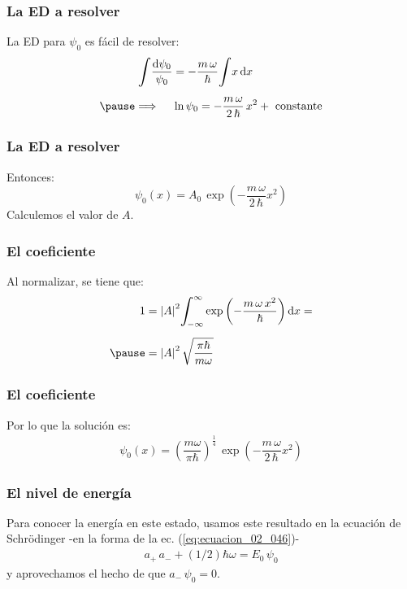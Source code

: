 \documentclass[12pt]{beamer}
\begin{document}
\begin{frame}
\frametitle{La ED a resolver}
La ED para $\psi_{0}$ es fácil de resolver:
\pause
\begin{eqnarray*}
\begin{aligned}
\scaleint{6ex} \dfrac{\dd{\psi_{0}}}{\psi_{0}} &= - \dfrac{m \, \omega}{\hbar} \scaleint{6ex} x \dd{x} \\[0.5em] \pause
\Longrightarrow \hspace{0.5cm} &\ln \psi_{0} = - \dfrac{m \, \omega}{2 \, \hbar} \, x^{2} + \text{ constante}
\end{aligned}
\end{eqnarray*}
\end{frame}
\begin{frame}
\frametitle{La ED a resolver}
Entonces:
\pause
\begin{equation}
\psi_{0} (x) = A_{0} \, \exp \left( - \dfrac{m \, \omega}{2 \, \hbar} x^{2} \right)
\label{eq:ecuacion_02_048}
\end{equation}
\pause
Calculemos el valor de $A$.
\end{frame}
\begin{frame}
\frametitle{El coeficiente}
Al normalizar, se tiene que:
\begin{eqnarray*}
\begin{aligned}
1 &= \abs{A}^{2} \scaleint{6ex}_{\bs - \infty}^{\infty} \exp \left( - \dfrac{m \, \omega \, x^{2}}{\hbar} \right) \dd{x} = \\[0.5em] \pause
&= \abs{A}^{2} \, \sqrt{\dfrac{\pi \hbar}{m \omega}}
\end{aligned}
\end{eqnarray*}
\end{frame}
\begin{frame}
\frametitle{El coeficiente}
Por lo que la solución es:
\pause
\begin{align*}
\psi_{0} (x) = \left( \dfrac{m \omega}{\pi \hbar} \right)^{\frac{1}{4}} \, \exp \left( - \dfrac{m \, \omega}{2 \, \hbar} x^{2} \right)
\end{align*}
\end{frame}
\begin{frame}
\frametitle{El nivel de energía}
Para conocer la energía en este estado, usamos este resultado en la ecuación de Schrödinger -en la forma de la ec. (\ref{eq:ecuacion_02_046})-
\begin{align*}
a_{+} \, a_{-} + (1/2) \hbar \omega = E_{0} \, \psi_{0}
\end{align*}
y aprovechamos el hecho de que $a_{-} \, \psi_{0} = 0$.
\end{frame}
\end{document}
